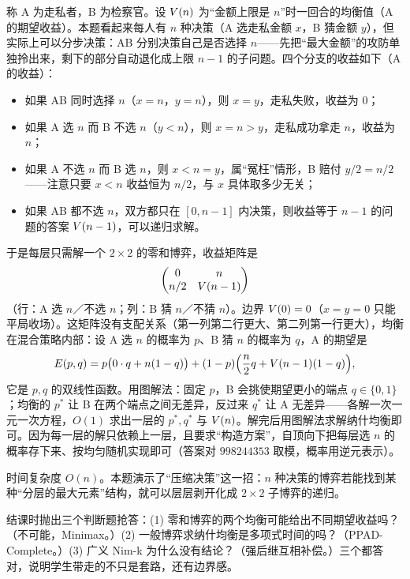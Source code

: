 \sol 称 A 为走私者，B 为检察官。设 $V(n)$ 为“金额上限是 $n$”时一回合的均衡值（A 的期望收益）。本题看起来每人有 $n$ 种决策（A 选走私金额 $x$，B 猜金额 $y$），但实际上可以分步决策：AB 分别决策自己是否选择 $n$——先把“最大金额”的攻防单独拎出来，剩下的部分自动退化成上限 $n-1$ 的子问题。四个分支的收益如下（A 的收益）：
\begin{itemize}
\item 如果 AB 同时选择 $n$（$x=n$，$y=n$），则 $x=y$，走私失败，收益为 $0$；
\item 如果 A 选 $n$ 而 B 不选 $n$（$y<n$），则 $x=n>y$，走私成功拿走 $n$，收益为 $n$；
\item 如果 A 不选 $n$ 而 B 选 $n$，则 $x<n=y$，属“冤枉”情形，B 赔付 $y/2=n/2$——注意只要 $x<n$ 收益恒为 $n/2$，与 $x$ 具体取多少无关；
\item 如果 AB 都不选 $n$，双方都只在 $[0,n-1]$ 内决策，则收益等于 $n-1$ 的问题的答案 $V(n-1)$，可以递归求解。
\end{itemize}
于是每层只需解一个 $2\times2$ 的零和博弈，收益矩阵是
\[
 \begin{pmatrix}0&n\\ n/2&V(n-1)\end{pmatrix}
\]
（行：A 选 $n$／不选 $n$；列：B 猜 $n$／不猜 $n$）。边界 $V(0)=0$（$x=y=0$ 只能平局收场）。这矩阵没有支配关系（第一列第二行更大、第二列第一行更大），均衡在混合策略内部：设 A 选 $n$ 的概率为 $p$、B 猜 $n$ 的概率为 $q$，A 的期望是
\[
 E(p,q)=p\bigl(0\cdot q+n(1-q)\bigr)+(1-p)\Bigl(\frac n2 q+V(n-1)(1-q)\Bigr),
\]
它是 $p,q$ 的双线性函数。用图解法：固定 $p$，B 会挑使期望更小的端点 $q\in\{0,1\}$；均衡的 $p^{*}$ 让 B 在两个端点之间无差异，反过来 $q^{*}$ 让 A 无差异——各解一次一元一次方程，$O(1)$ 求出一层的 $p^{*},q^{*}$ 与 $V(n)$。解完后用图解法求解纳什均衡即可。因为每一层的解只依赖上一层，且要求“构造方案”，自顶向下把每层选 $n$ 的概率存下来、按均匀随机实现即可（答案对 $998244353$ 取模，概率用逆元表示）。

\cost 时间复杂度 $O(n)$。本题演示了“压缩决策”这一招：$n$ 种决策的博弈若能找到某种“分层的最大元素”结构，就可以层层剥开化成 $2\times2$ 子博弈的递归。


\begin{teach}
结课时抛出三个判断题抢答：(1) 零和博弈的两个均衡可能给出不同期望收益吗？（不可能，Minimax。）(2) 一般博弈求纳什均衡是多项式时间的吗？（PPAD-Complete。）(3) 广义 Nim-k 为什么没有结论？（强后继互相补偿。）三个都答对，说明学生带走的不只是套路，还有边界感。
\end{teach}

